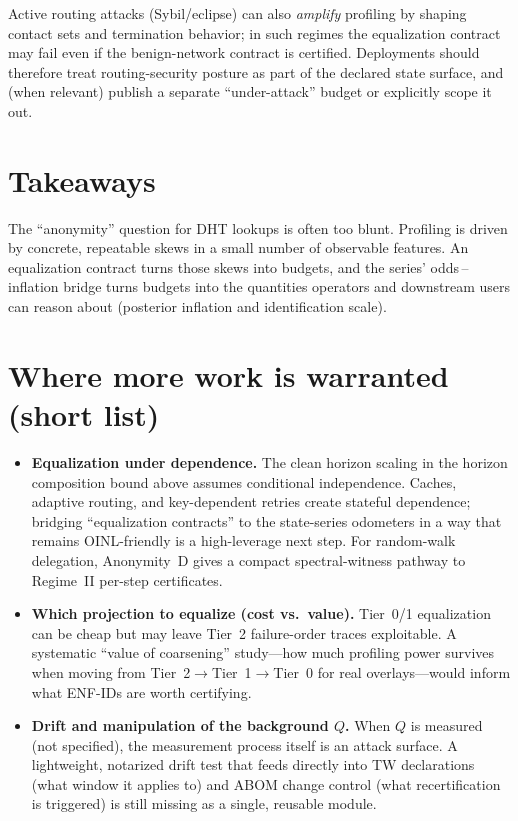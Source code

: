 \documentclass[11pt]{article}
\begin{document}
Active routing attacks (Sybil/eclipse) can also \emph{amplify} profiling by shaping contact sets and termination behavior; in such regimes the equalization contract may fail even if the benign-network contract is certified. Deployments should therefore treat routing-security posture as part of the declared state surface, and (when relevant) publish a separate ``under-attack'' budget or explicitly scope it out.\cite{nettoSybilIPFSDHT2025,cholezSybilIPFSARES2024}

\section{Takeaways}
The ``anonymity'' question for DHT lookups is often too blunt.
Profiling is driven by concrete, repeatable skews in a small number of observable features.
An equalization contract turns those skews into budgets, and the series' odds\,--\,inflation bridge turns budgets into the quantities operators and downstream users can reason about (posterior inflation and identification scale).

\section{Where more work is warranted (short list)}
\begin{itemize}[leftmargin=*]
\item \textbf{Equalization under dependence.} The clean horizon scaling in the horizon composition bound above assumes conditional independence.
Caches, adaptive routing, and key-dependent retries create stateful dependence; bridging ``equalization contracts'' to the state-series odometers in a way that remains OINL-friendly is a high-leverage next step. For random-walk delegation, Anonymity~D gives a compact spectral-witness pathway to Regime~II per-step certificates.\cite{series:state1,series:condcert,series:spectral2budget}
\item \textbf{Which projection to equalize (cost vs.\ value).} Tier~0/1 equalization can be cheap but may leave Tier~2 failure-order traces exploitable.
A systematic ``value of coarsening'' study---how much profiling power survives when moving from Tier~2$\to$Tier~1$\to$Tier~0 for real overlays---would inform what ENF-IDs are worth certifying.\cite{series:traceifaces}
\item \textbf{Drift and manipulation of the background $Q$.} When $Q$ is measured (not specified), the measurement process itself is an attack surface.
A lightweight, notarized drift test that feeds directly into TW declarations (what window it applies to) and ABOM change control (what recertification is triggered) is still missing as a single, reusable module.\cite{series:threatwindows,series:accountingrulebook,series:abomoinl}
\end{itemize}
\end{document}
